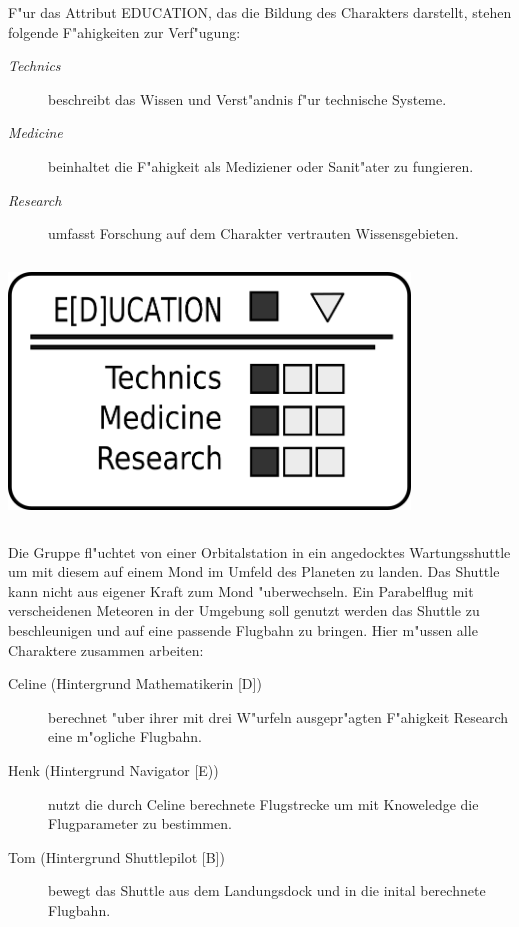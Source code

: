 \begin{column}[l]{0.55}
    F"ur das Attribut EDUCATION, das die Bildung des Charakters darstellt, stehen folgende F"ahigkeiten zur Verf"ugung:

    \begin{description}
        \item[\emph{Technics}] beschreibt das Wissen und Verst"andnis f"ur technische Systeme.
        \item[\emph{Medicine}] beinhaltet die F"ahigkeit als Mediziener oder Sanit"ater zu fungieren.
        \item[\emph{Research}] umfasst Forschung auf dem Charakter vertrauten Wissensgebieten.
    \end{description}
\end{column}
\begin{column}[r]{0.45}
    \centering
    \includegraphics[width=0.80\textwidth]{images/character_education.png}
\end{column}

\medskip
\begin{ruleexample}
    Die Gruppe fl"uchtet von einer Orbitalstation in ein angedocktes Wartungsshuttle um mit diesem auf einem Mond im Umfeld des Planeten zu landen. Das Shuttle kann nicht aus eigener Kraft zum Mond "uberwechseln. Ein Parabelflug mit verscheidenen Meteoren in der Umgebung soll genutzt werden das Shuttle zu beschleunigen und auf eine passende Flugbahn zu bringen. Hier m"ussen alle Charaktere zusammen arbeiten:

\begin{description}
        \item[Celine ({Hintergrund Mathematikerin [D]})] berechnet "uber ihrer mit drei W"urfeln ausgepr"agten F"ahigkeit Research eine 
            m"ogliche Flugbahn.
        \item[Henk ({Hintergrund Navigator [E)})] nutzt die durch Celine berechnete Flugstrecke um mit Knoweledge die Flugparameter zu 
            bestimmen.
        \item[Tom ({Hintergrund Shuttlepilot [B]})] bewegt das Shuttle aus dem Landungsdock und in die inital berechnete Flugbahn.
    \end{description}
\end{ruleexample}

